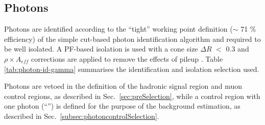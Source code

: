\subsection{Photons}
\label{sec:photon-id}
Photons are identified according to the ``tight'' working point definition ($\sim$ 71 $\%$ efficiency) 
of the simple cut-based photon identification algorithm \cite{photon-id} 
and required to be well isolated. 
A PF-based isolation is used with a cone size $\Delta R$ $<$ 0.3 and
$\rho\times A_{eff}$ corrections are applied to remove the effects of pileup \cite{pf-photon}. 
Table \ref{tab:photon-id-gamma} summarises the identification and isolation selection used. 

Photons are vetoed in the definition of the hadronic signal region and
muon control regions, as described in Sec.~\ref{sec:preSelection},
while a control region with one photon (``\gj'') is defined for the
purpose of the background estimation, as described in
Sec.~\ref{subsec:photoncontrolSelection}.


